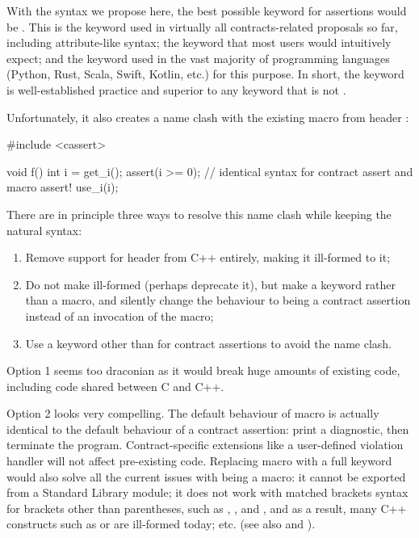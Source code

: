 With the syntax we propose here, the best possible keyword for assertions would be . This is the keyword used in virtually all contracts-related proposals so far, including attribute-like syntax; the keyword that most users would intuitively expect; and the keyword used in the vast majority of programming languages (Python, Rust, Scala, Swift, Kotlin, etc.) for this purpose. In short, the keyword  is well-established practice and superior to any keyword that is not .

Unfortunately, it also creates a name clash with the existing  macro from header :

\pagebreak %

\begin{codeblock}
#include <cassert> 

void f() {
  int i = get_i();
  assert(i >= 0);  // identical syntax for contract assert and macro assert!
  use_i(i);
}
\end{codeblock}

There are in principle three ways to resolve this name clash while keeping the natural syntax:
\begin{enumerate}
\item Remove support for header  from C++ entirely, making it ill-formed to  it;
\item Do not make  ill-formed (perhaps deprecate it), but make  a keyword rather than a macro, and silently change the behaviour to being a contract assertion instead of an invocation of the macro;
\item Use a keyword other than  for contract assertions to avoid the name clash.
\end{enumerate}
Option 1 seems too draconian as it would break huge amounts of existing code, including code shared between C and C++.

Option 2 looks very compelling. The default behaviour of macro  is actually identical to the default behaviour of a contract assertion: print a diagnostic, then terminate the program. Contract-specific extensions like a user-defined violation handler will not affect pre-existing code. Replacing macro  with a full keyword would also solve all the current issues with  being a macro: it cannot be exported from a Standard Library module; it does not work with matched brackets syntax for brackets other than parentheses, such as , , and \tcode{[...]}, and as a result, many C++ constructs such as  or  are ill-formed today; etc. (see also \cite{P2264R5} and \cite{P2884R0}).

